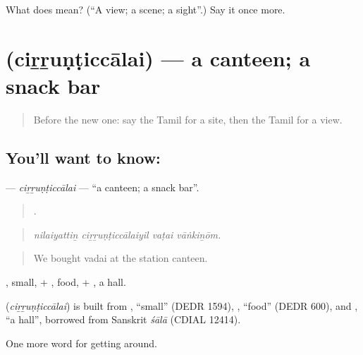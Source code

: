 \begin{tcolorbox}[breakable,colback=teal!4,colframe=teal!35!black,title={Before you move on}]
What does  mean? (\textquotedblleft{}A view; a scene; a sight\textquotedblright{}.) Say it once more.
\end{tcolorbox}
\section[\texorpdfstring{\ta{சிற்றுண்டிச்சாலை} (ciṟṟuṇṭiccālai)}{சிற்றுண்டிச்சாலை (ciṟṟuṇṭiccālai)}]{ (ciṟṟuṇṭiccālai) — a canteen; a snack bar}

\label{lesson:TA-C425-cirrunticcalai}



\begin{quote}
Before the new one: say the Tamil for a site, then the Tamil for a view.
\end{quote}

\subsection*{You'll want to know: }
\textbf{} — \emph{ciṟṟuṇṭiccālai} — \textquotedblleft{}a canteen; a snack bar\textquotedblright{}.

\begin{quote}
   .
\end{quote}

\begin{quote}
\emph{nilaiyattiṉ ciṟṟuṇṭiccālaiyil vaṭai vāṅkiṉōm.}
\end{quote}

\begin{quote}
We bought vadai at the station canteen.
\end{quote}

, small, + , food, + , a hall.

\begin{cousinweb}
\textbf{} (\emph{ciṟṟuṇṭiccālai}) is built from , \textquotedblleft{}small\textquotedblright{} (DEDR 1594), , \textquotedblleft{}food\textquotedblright{} (DEDR 600), and , \textquotedblleft{}a hall\textquotedblright{}, borrowed from Sanskrit \emph{śālā} (CDIAL 12414).
\end{cousinweb}

\begin{grammarlens}[title={What you've built}]
One more word for getting around.
\end{grammarlens}

